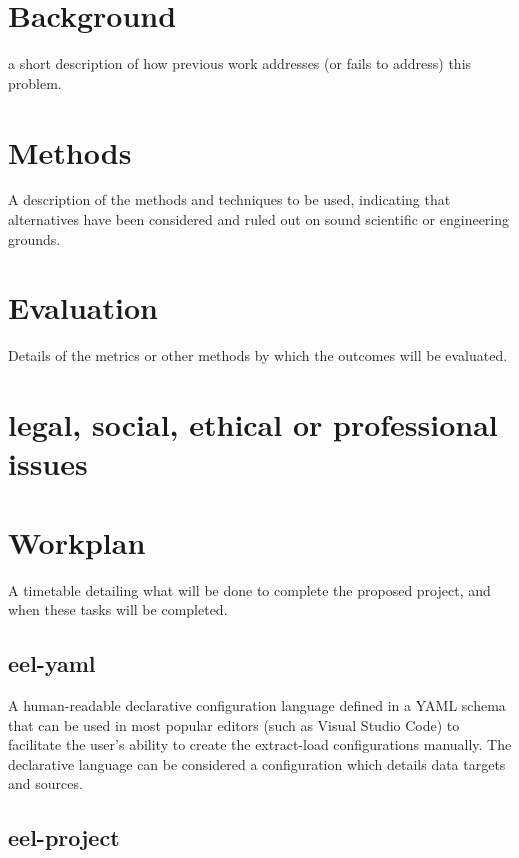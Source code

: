 \chapter{Background}\label{background}

a short description of how previous work addresses (or fails to address)
this problem.

\chapter{Methods}\label{methods}

A description of the methods and techniques to be used, indicating that
alternatives have been considered and ruled out on sound scientific or
engineering grounds.

\chapter{Evaluation}\label{evaluation}

Details of the metrics or other methods by which the outcomes will be
evaluated.

\chapter{legal, social, ethical or professional
issues}\label{legal-social-ethical-or-professional-issues}

\chapter{Workplan}\label{workplan}

A timetable detailing what will be done to complete the proposed
project, and when these tasks will be completed.

\section{eel-yaml}\label{eel-yaml}

A human-readable declarative configuration language defined in a YAML
schema that can be used in most popular editors (such as Visual Studio
Code) to facilitate the user's ability to create the extract-load
configurations manually. The declarative language can be considered a
configuration which details data targets and sources.

\section{eel-project}\label{eel-project}

